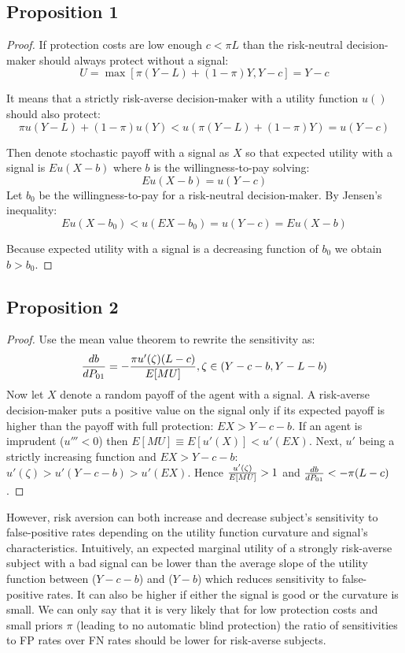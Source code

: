 \documentclass[12pt,a4paper]{article}
\begin{document}
\subsection{Proposition 1}
\begin{proof} If protection costs are low enough $c<\pi L$ than the risk-neutral decision-maker should always protect without a signal:
$$U=\max[\pi(Y-L)+(1-\pi)Y,Y-c]=Y-c$$

It means that a strictly risk-averse decision-maker with a utility function $u()$ should also protect:
$$\pi u(Y-L)+(1-\pi)u(Y)<u(\pi(Y-L)+(1-\pi)Y)=u(Y-c)$$

Then denote stochastic payoff with a signal as $X$ so that expected utility with a signal is $Eu(X-b)$ where $b$ is the willingness-to-pay solving:
$$Eu(X-b)=u(Y-c)$$
 Let $b_0$ be the willingness-to-pay for a risk-neutral decision-maker. By Jensen's inequality:
$$Eu(X-b_0)<u(EX-b_0)=u(Y-c)=Eu(X-b)$$

Because expected utility with a signal is a decreasing function of $b_0$ we obtain $b>b_0$. \end{proof} 

\subsection{Proposition 2}
\begin{proof}
Use the mean value theorem to rewrite the sensitivity as:
$${db\over dP_{01}}=-{\pi u'(\zeta)(L-c)\over E[MU]},\zeta \in \left(Y-c-b, Y-L-b\right)$$
Now let $X$ denote a random payoff of the agent with a signal. A risk-averse decision-maker puts a positive value on the signal only if its expected payoff is higher than the payoff with full protection: $EX>Y-c-b$. If an agent is imprudent ($u'''<0$) then $E[MU]\equiv E[u'(X)]<u'(EX)$. Next, $u'$ being a strictly increasing function and $EX>Y-c-b$: $u'(\zeta)>u'(Y-c-b)>u'(EX)$. Hence ${u'(\zeta)\over E[MU]}>1$ and ${db\over dP_{01}}<-\pi(L-c)$. 
\end{proof}

However, risk aversion can both increase and decrease subject's sensitivity to false-positive rates depending on the utility function curvature and signal's characteristics. Intuitively, an expected marginal utility of a strongly risk-averse subject with a bad signal can be lower than the average slope of the utility function between ($Y-c-b$) and ($Y-b$) which reduces sensitivity to false-positive rates. It can also be higher if either the signal is good or the curvature is small. We can only say that it is very likely that for low protection costs and small priors $\pi$ (leading to no automatic blind protection) the ratio of sensitivities to FP rates over FN rates should be lower for risk-averse subjects. 
\end{document}
